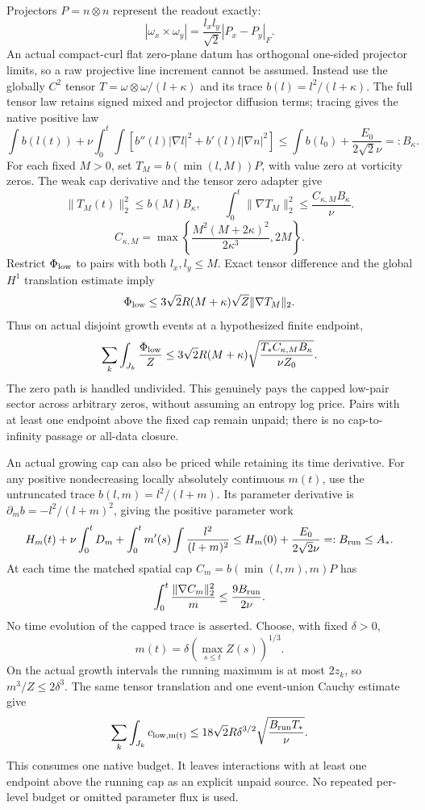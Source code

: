 \documentclass[11pt]{article}
\begin{document}
Projectors $P=n\otimes n$ represent the readout exactly:
\[
 |\omega_x\times\omega_y|
    =\frac{l_xl_y}{\sqrt2}|P_x-P_y|_F.
\]
An actual compact-curl flat zero-plane datum has orthogonal one-sided
projector limits, so a raw projective line increment cannot be assumed.
Instead use the globally $C^2$ tensor
$T=\omega\otimes\omega/(l+\kappa)$ and its trace
$b(l)=l^2/(l+\kappa)$. The full tensor law retains signed mixed and
projector diffusion terms; tracing gives the native positive law
\[
 \int b(l(t))+\nu\int_0^t\!\int
   \left[b''(l)|\nabla l|^2+b'(l)l|\nabla n|^2\right]
 \le\int b(l_0)+\frac{E_0}{2\sqrt2\nu}=:B_\kappa.
\]
For each fixed $M>0$, set $T_M=b(\min(l,M))P$, with value zero at
vorticity zeros. The weak cap derivative and the tensor zero adapter give
\[
 \|T_M(t)\|_2^2\le b(M)B_\kappa,\qquad
 \int_0^t\|\nabla T_M\|_2^2\le\frac{C_{\kappa,M}B_\kappa}{\nu}.
\]
\[
 C_{\kappa,M}=\max\left\{
 \frac{M^2(M+2\kappa)^2}{2\kappa^3},2M\right\}.
\]
Restrict $\Phi_{\rm low}$ to pairs with both $l_x,l_y\le M$. Exact
tensor difference and the global $H^1$ translation estimate imply
\[
 \Phi_{\rm low}\le3\sqrt2R(M+\kappa)\sqrt Z\|\nabla T_M\|_2.
\]
Thus on actual disjoint growth events at a hypothesized finite endpoint,
\[
 \sum_k\int_{J_k}\frac{\Phi_{\rm low}}Z
 \le3\sqrt2R(M+\kappa)
       \sqrt{\frac{T_*C_{\kappa,M}B_\kappa}{\nu Z_0}}.
\]
The zero path is handled undivided. This genuinely pays the capped low-pair
sector across arbitrary zeros, without assuming an entropy log price.
Pairs with at least one endpoint above the fixed cap remain unpaid;
there is no cap-to-infinity passage or all-data closure.

An actual growing cap can also be priced while retaining its time derivative.
For any positive nondecreasing locally absolutely continuous $m(t)$, use
the untruncated trace $b(l,m)=l^2/(l+m)$. Its parameter derivative is
$\partial_m b=-l^2/(l+m)^2$, giving the positive parameter work
\[
 H_m(t)+\nu\int_0^tD_m
       +\int_0^t m'(s)\int\frac{l^2}{(l+m)^2}
 \le H_m(0)+\frac{E_0}{2\sqrt2\nu}=:B_{\rm run}\le A_*.
\]
At each time the matched spatial cap $C_m=b(\min(l,m),m)P$ has
\[
 \int_0^t\frac{\|\nabla C_m\|_2^2}{m}\le\frac{9B_{\rm run}}{2\nu}.
\]
No time evolution of the capped trace is asserted. Choose, with fixed
$\delta>0$,
\[
 m(t)=\delta\left(\max_{s\le t}Z(s)\right)^{1/3}.
\]
On the actual growth intervals the running maximum is at most $2z_k$,
so $m^3/Z\le2\delta^3$. The same tensor translation and one event-union
Cauchy estimate give
\[
 \sum_k\int_{J_k}c_{\rm low,m(t)}
 \le18\sqrt2R\delta^{3/2}\sqrt{\frac{B_{\rm run}T_*}{\nu}}.
\]
This consumes one native budget. It leaves interactions with at least one
endpoint above the running cap as an explicit unpaid source. No repeated
per-level budget or omitted parameter flux is used.
\end{document}
